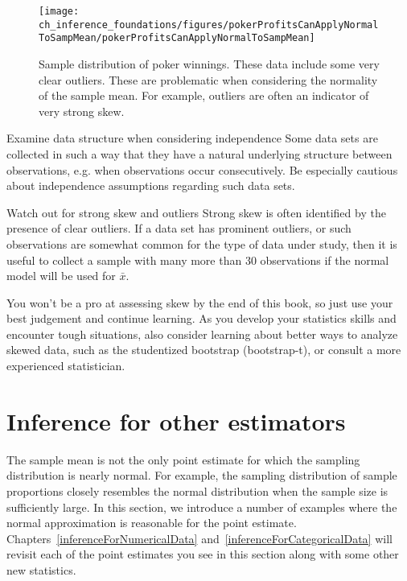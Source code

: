 \begin{figure}[ht]
   \centering
   \texttt{[image: ch\_inference\_foundations/figures/pokerProfitsCanApplyNormalToSampMean/pokerProfitsCanApplyNormalToSampMean]}
   \caption{Sample distribution of poker winnings. These data include some very clear outliers. These are problematic when considering the normality of the sample mean. For example, outliers are often an indicator of very strong skew.}
   \label{pokerProfitsCanApplyNormalToSampMean}
\end{figure}

\begin{caution}
{Examine data structure when considering independence}
{Some data sets are collected in such a way that they have a natural underlying structure between observations, e.g. when observations occur consecutively. Be especially cautious about independence assumptions regarding such data sets.}
\end{caution}

\begin{caution}{Watch out for strong skew and outliers}
{Strong skew is often identified by the presence of clear outliers. If a data set has prominent outliers, or such observations are somewhat common for the type of data under study, then it is useful to collect a sample with many more than 30 observations if the normal model will be used for $\bar{x}$.}
\end{caution}

You won't be a pro at assessing skew by the end of this book, so just use your best judgement and continue learning. As you develop your statistics skills and encounter tough situations, also consider learning about better ways to analyze skewed data, such as the studentized bootstrap (bootstrap-t), or consult a more experienced statistician.



\section[Inference for other estimators]{Inference for other estimators }
\label{aFrameworkForInference}

The sample mean is not the only point estimate for which the sampling distribution is nearly normal. For example, the sampling distribution of sample proportions closely resembles the normal distribution when the sample size is sufficiently large. In this section, we introduce a number of examples where the normal approximation is reasonable for the point estimate. Chapters~\ref{inferenceForNumericalData} and~\ref{inferenceForCategoricalData} will revisit each of the point estimates you see in this section along with some other new statistics.

